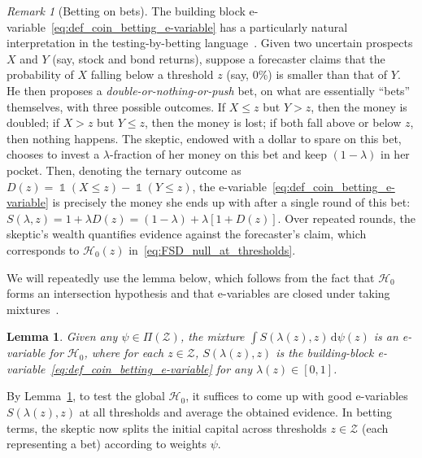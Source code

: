 \documentclass[12pt,twoside]{article}
\theoremstyle{plain}
\newtheorem{lemma}{Lemma}
\theoremstyle{definition}
\theoremstyle{remark}
\newtheorem{remark}{Remark}
\newcommand{\inparen}[1]{\left(#1\right)}
\DeclareMathOperator*{\indsymb}{\mathds{1}}
\newcommand{\indicator}[1]{\indsymb\inparen{#1}}
\newcommand{\calH}{\mathcal{H}}
\newcommand{\calZ}{\mathcal{Z}}
\newcommand{\diff}{\,\mathrm{d}}
\begin{document}
\begin{remark}[Betting on bets]\label{remark:betting_on_bets}
    The building block e-variable~\eqref{eq:def_coin_betting_e-variable} has a particularly natural interpretation in the testing-by-betting language~\citep{shafer2019game}. 
    Given two uncertain prospects $X$ and $Y$ (say, stock and bond returns), suppose a forecaster claims that the probability of $X$ falling below a threshold $z$ (say, 0\%) is smaller than that of $Y$. 
    He then proposes a \emph{double-or-nothing-or-push} bet, on what are essentially ``bets'' themselves, with three possible outcomes. 
    If $X \leq z$ but $Y > z$, then the money is doubled; if $X > z$ but $Y \leq z$, then the money is lost; if both fall above or below $z$, then nothing happens.
    The skeptic, endowed with a dollar to spare on this bet, chooses to invest a $\lambda$-fraction of her money on this bet and keep $(1-\lambda)$ in her pocket. 
    Then, denoting the ternary outcome as $D(z) = \indicator{X \leq z} - \indicator{Y \leq z}$, the e-variable~\eqref{eq:def_coin_betting_e-variable} is precisely the money she ends up with after a single round of this bet: $S(\lambda, z) = 1 + \lambda D(z) = (1 - \lambda) + \lambda [1 + D(z)]$. 
    Over repeated rounds, the skeptic's wealth quantifies evidence against the forecaster's claim, which corresponds to $\calH_0(z)$ in~\eqref{eq:FSD_null_at_thresholds}. 
\end{remark}

We will repeatedly use the lemma below, which follows from the fact that $\calH_0$ forms an intersection hypothesis and that e-variables are closed under taking mixtures~\citep[see, e.g.,][]{vovk2021evalues}. 
\begin{lemma}\label{lem:finite_mixtures_are_sufficient_to_test_FSD_null}
    Given any $\psi \in \Pi(\calZ)$, the mixture $\int S(\lambda(z), z) \diff \psi(z)$ is an e-variable for $\calH_0$, where for each $z \in \calZ$, $S(\lambda(z), z)$ is the building-block e-variable~\eqref{eq:def_coin_betting_e-variable} for any $\lambda(z)\in [0,1]$.
\end{lemma}

By Lemma~\ref{lem:finite_mixtures_are_sufficient_to_test_FSD_null}, to test the global $\calH_0$, it suffices to come up with good e-variables $S(\lambda(z),z)$ at all thresholds and average the obtained evidence. 
In betting terms, the skeptic now splits the initial capital across thresholds $z \in \calZ$ (each representing a bet) according to weights $\psi$.
\end{document}
